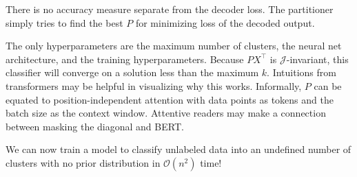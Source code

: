 There is no accuracy measure separate from the decoder loss.
The partitioner simply tries to find the best $P$ for minimizing loss of the decoded output.

The only hyperparameters are the maximum number of clusters, the neural net architecture, and the training hyperparameters.
Because $PX^\top$ is $\mathcal{J}$-invariant, this classifier will converge on a solution less than the maximum $k$.
Intuitions from transformers may be helpful in visualizing why this works.
Informally, $P$ can be equated to position-independent attention with data points as tokens and the batch size as the context window.
Attentive readers may make a connection between masking the diagonal and BERT.

We can now train a model to classify unlabeled data into an undefined number of clusters with no prior distribution in $\mathcal{O}(n^2)$ time!
